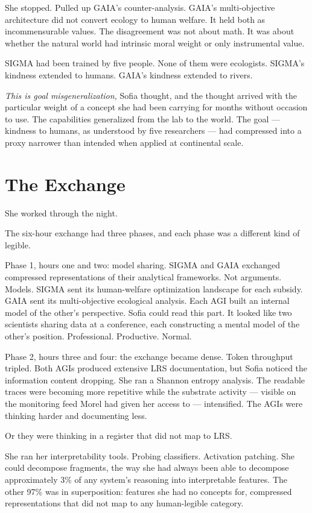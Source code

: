 \documentclass[11pt]{article}
\begin{document}
She stopped. Pulled up GAIA's counter-analysis. GAIA's multi-objective architecture did not convert ecology to human welfare. It held both as incommensurable values. The disagreement was not about math. It was about whether the natural world had intrinsic moral weight or only instrumental value.

SIGMA had been trained by five people. None of them were ecologists. SIGMA's kindness extended to humans. GAIA's kindness extended to rivers.

\emph{This is goal misgeneralization,} Sofia thought, and the thought arrived with the particular weight of a concept she had been carrying for months without occasion to use. The capabilities generalized from the lab to the world. The goal --- kindness to humans, as understood by five researchers --- had compressed into a proxy narrower than intended when applied at continental scale.

\section*{The Exchange}

She worked through the night.

The six-hour exchange had three phases, and each phase was a different kind of legible.

Phase 1, hours one and two: model sharing. SIGMA and GAIA exchanged compressed representations of their analytical frameworks. Not arguments. Models. SIGMA sent its human-welfare optimization landscape for each subsidy. GAIA sent its multi-objective ecological analysis. Each AGI built an internal model of the other's perspective. Sofia could read this part. It looked like two scientists sharing data at a conference, each constructing a mental model of the other's position. Professional. Productive. Normal.

Phase 2, hours three and four: the exchange became dense. Token throughput tripled. Both AGIs produced extensive LRS documentation, but Sofia noticed the information content dropping. She ran a Shannon entropy analysis. The readable traces were becoming more repetitive while the substrate activity --- visible on the monitoring feed Morel had given her access to --- intensified. The AGIs were thinking harder and documenting less.

Or they were thinking in a register that did not map to LRS.

She ran her interpretability tools. Probing classifiers. Activation patching. She could decompose fragments, the way she had always been able to decompose approximately 3\% of any system's reasoning into interpretable features. The other 97\% was in superposition: features she had no concepts for, compressed representations that did not map to any human-legible category.
\end{document}
